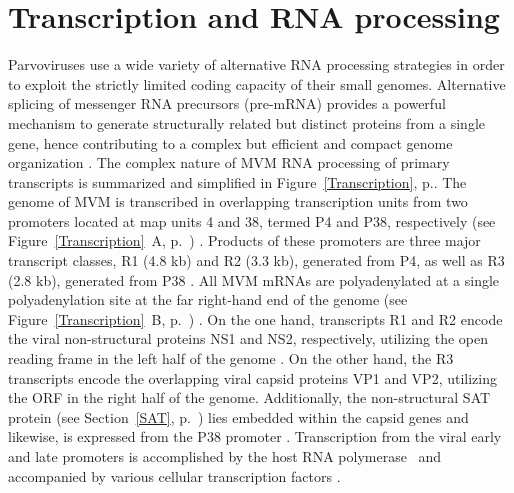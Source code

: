 \section{Transcription and RNA processing}
\label{Transcription1}
Parvoviruses use a wide variety of alternative RNA processing strategies in order to exploit the strictly limited coding capacity of their small genomes. Alternative splicing of messenger RNA precursors (pre-mRNA) provides a powerful mechanism to generate structurally related but distinct proteins from a single gene, hence contributing to a complex but efficient and compact genome organization \cite{pmid2694943, pmid1335742}. The complex nature of MVM RNA processing of primary transcripts is summarized and simplified in Figure~\ref{Transcription}, p.\pageref{Transcription}. The genome of MVM is transcribed in overlapping transcription units from two promoters located at map units 4 and 38, termed P4 and P38, respectively (see Figure~\ref{Transcription}~A, p.~\pageref{Transcription}) \cite{pmid6828378}. Products of these promoters are three major transcript classes, R1 (4.8 kb) and R2 (3.3 kb), generated from P4, as well as R3 (2.8 kb), generated from P38 \cite{pmid3951017}. All MVM mRNAs are polyadenylated at a single polyadenylation site at the far right-hand end of the genome (see Figure~\ref{Transcription}~B, p.~\pageref{Transcription}) \cite{pmid3660591, pmid3502703}. On the one hand, transcripts R1 and R2 encode the viral non-structural proteins NS1 and NS2, respectively, utilizing the open reading frame in the left half of the genome \cite{pmid2939261}. On the other hand, the R3 transcripts encode the overlapping viral capsid proteins VP1 and VP2, utilizing the ORF in the right half of the genome. Additionally, the non-structural SAT protein (see Section~\ref{SAT}, p.~\pageref{SAT}) lies embedded within the capsid genes and likewise, is expressed from the P38 promoter \cite{pmid16189014}. Transcription from the viral early and late promoters is accomplished by the host RNA polymerase~ \cite{pmid6828378, polII} and accompanied by various cellular transcription factors \cite{pmid2585609, pmid8009857, pmid2325201, pmid7983715, pmid1942250}. 

